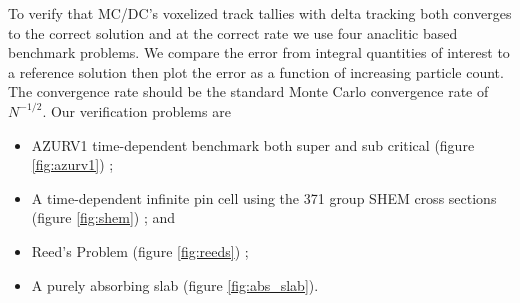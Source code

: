 To verify that MC/DC's voxelized track tallies with delta tracking both converges to the correct solution and at the correct rate we use four anaclitic based benchmark problems.
We compare the error from integral quantities of interest to a reference solution then plot the error as a function of increasing particle count.
The convergence rate should be the standard Monte Carlo convergence rate of $N^{-1/2}$.
Our verification problems are
\begin{itemize}
    \item AZURV1 time-dependent benchmark both super and sub critical (figure \ref{fig:azurv1}) \cite{ganapol_homogeneous_2001};
    \item A time-dependent infinite pin cell using the 371 group SHEM cross sections (figure \ref{fig:shem}) \cite{hfaiedh_2005_shem}; and 
    \item Reed's Problem (figure \ref{fig:reeds}) \cite{reed_difference_1971};
    \item A purely absorbing slab (figure \ref{fig:abs_slab}).
\end{itemize}
